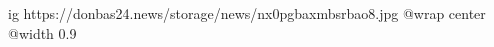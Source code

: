  
 
 
 
 

\ifcmt
  ig https://donbas24.news/storage/news/nx0pgbaxmbsrbao8.jpg
  @wrap center
  @width 0.9
\fi

